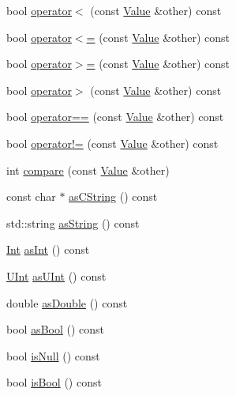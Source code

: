 \begin{DoxyCompactItemize}
\item 
bool \hyperlink{classJson_1_1Value_af0ad8aa027575c3277296458f3fb7b0a}{operator$<$} (const \hyperlink{classJson_1_1Value}{Value} \&other) const 
\item 
bool \hyperlink{classJson_1_1Value_afb99dd3628fe44244b32007f9b4f369a}{operator$<$=} (const \hyperlink{classJson_1_1Value}{Value} \&other) const 
\item 
bool \hyperlink{classJson_1_1Value_acc13fc47d55abd6e2327b090b83d2911}{operator$>$=} (const \hyperlink{classJson_1_1Value}{Value} \&other) const 
\item 
bool \hyperlink{classJson_1_1Value_a3124a26067bdfde9571bc89527fc6931}{operator$>$} (const \hyperlink{classJson_1_1Value}{Value} \&other) const 
\item 
bool \hyperlink{classJson_1_1Value_a14363dda23a6ae2def9afd1590ae85d3}{operator==} (const \hyperlink{classJson_1_1Value}{Value} \&other) const 
\item 
bool \hyperlink{classJson_1_1Value_ad0f12d2a4ab74bbef08a05504b2cb81d}{operator!=} (const \hyperlink{classJson_1_1Value}{Value} \&other) const 
\item 
int \hyperlink{classJson_1_1Value_a4df212f0366cc7744e415972fd5c701b}{compare} (const \hyperlink{classJson_1_1Value}{Value} \&other)
\item 
const char $\ast$ \hyperlink{classJson_1_1Value_aa900f2afa2e097086b7759f31d501efc}{as\-C\-String} () const 
\item 
std\-::string \hyperlink{classJson_1_1Value_a03ee3d5df576640c93ba683f140828bd}{as\-String} () const 
\item 
\hyperlink{classJson_1_1Value_abdf7a7ff73eb130ffcab28504ffdb405}{Int} \hyperlink{classJson_1_1Value_aa0ab989674d22421f0862769953a9915}{as\-Int} () const 
\item 
\hyperlink{classJson_1_1Value_a0933d59b45793ae4aade1757c322a98d}{U\-Int} \hyperlink{classJson_1_1Value_ac4695cb0637219692ec0071d49505a00}{as\-U\-Int} () const 
\item 
double \hyperlink{classJson_1_1Value_a33434ed1c0217a34d04c95fa5342fd37}{as\-Double} () const 
\item 
bool \hyperlink{classJson_1_1Value_a7402c797285c020566c3db5f8ae4e940}{as\-Bool} () const 
\item 
bool \hyperlink{classJson_1_1Value_aeb9ad8b1bb91bdd72203dc884b3f4362}{is\-Null} () const 
\item 
bool \hyperlink{classJson_1_1Value_a3c3716cc7a0216cb1b654bb8f61c8d13}{is\-Bool} () const 
\item 

\end{DoxyCompactItemize}
